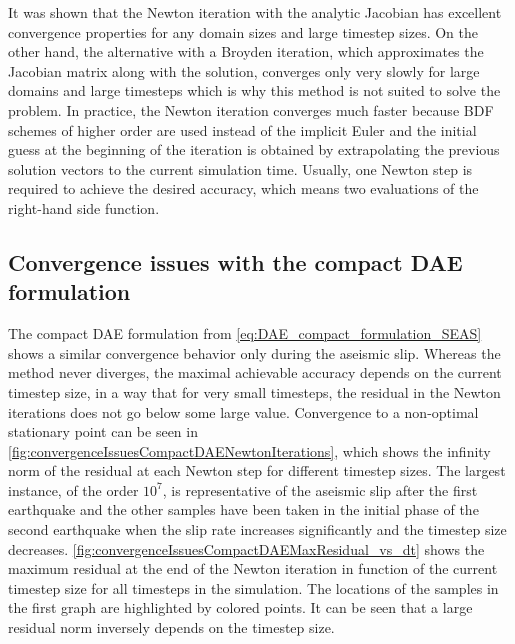 It was shown that the Newton iteration with the analytic Jacobian has excellent convergence properties for any domain sizes and large timestep sizes. On the other hand, the alternative with a Broyden iteration, which approximates the Jacobian matrix along with the solution, converges only very slowly for large domains and large timesteps which is why this method is not suited to solve the problem. In practice, the  Newton iteration converges much faster because BDF schemes of higher order are used instead of the implicit Euler and the initial guess at the beginning of the iteration is obtained by extrapolating the previous solution vectors to the current simulation time. Usually, one Newton step is required to achieve the desired accuracy, which means two evaluations of the right-hand side function. \\

\subsection{Convergence issues with the compact DAE formulation}
The compact DAE formulation from \autoref{eq:DAE_compact_formulation_SEAS} shows a similar convergence behavior only during the aseismic slip. Whereas the method never diverges, the maximal achievable accuracy depends on the current timestep size, in a way that for very small timesteps, the residual in the Newton iterations does not go below some large value. Convergence to a non-optimal stationary point can be seen in \autoref{fig:convergenceIssuesCompactDAENewtonIterations}, which shows the infinity norm of the residual at each Newton step for different timestep sizes. The largest instance, of the order $10^7$, is representative of the aseismic slip after the first earthquake and the other samples have been taken in the initial phase of the second earthquake when the slip rate increases significantly and the timestep size decreases. \autoref{fig:convergenceIssuesCompactDAEMaxResidual_vs_dt} shows the maximum residual at the end of the Newton iteration in function of the current timestep size for all timesteps in the simulation. The locations of the samples in the first graph are highlighted by colored points. It can be seen that a large residual norm inversely depends on the timestep size. \\ 


